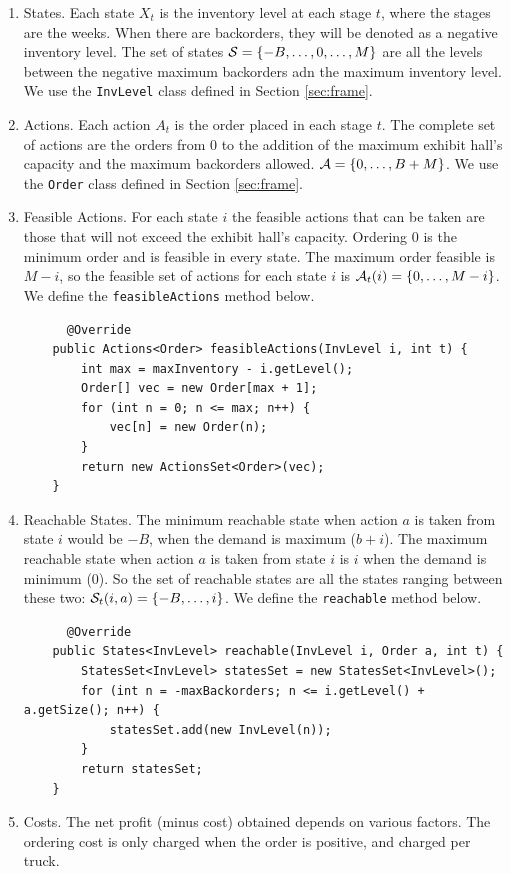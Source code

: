 \documentclass[11pt]{article}
\newcommand {\cA}{\ensuremath \mathcal{A}}
\newcommand {\cS}{\ensuremath \mathcal{S}}
\begin{document}
\begin{enumerate}
  \item States. Each state $X_t$ is the inventory level at each stage $t$, where the stages are the weeks. When there are backorders, they will be denoted as a negative inventory level. The set of states $\cS = \{-B, \ldots, 0, \ldots, M  \}$ are all the levels between the negative maximum backorders adn the maximum inventory level. We use the \lstinline!InvLevel! class defined in Section \ref{sec:frame}.
  \item Actions. Each action $A_t$ is the order placed in each stage $t$. The complete set of actions are the orders from 0 to the addition of the maximum exhibit hall's capacity and the maximum backorders allowed. $\cA = \{0,\ldots,B+M\}$. We use the \lstinline!Order! class defined in Section \ref{sec:frame}.
  \item Feasible Actions. For each state $i$ the feasible actions that can be taken are those that will not exceed the exhibit hall's capacity. Ordering 0 is the minimum order and is feasible in every state. The maximum order feasible is $M-i$, so the feasible set of actions for each state $i$ is $\cA_t(i) =\{0,\ldots,M-i\}$. We define the \lstinline!feasibleActions! method below.
  \begin{lstlisting}
      @Override
    public Actions<Order> feasibleActions(InvLevel i, int t) {
        int max = maxInventory - i.getLevel();
        Order[] vec = new Order[max + 1];
        for (int n = 0; n <= max; n++) {
            vec[n] = new Order(n);
        }
        return new ActionsSet<Order>(vec);
    }
  \end{lstlisting}
  \item Reachable States. The minimum reachable state when action $a$ is taken from state $i$ would be $-B$, when the demand is maximum ($b+i$). The maximum reachable state when action $a$ is taken from state $i$ is $i$ when the demand is minimum (0). So the set of reachable states are all the states ranging between these two: $\cS_t(i,a) = \{-B, \ldots, i\}$. We define the \lstinline!reachable! method below.
  \begin{lstlisting}
      @Override
    public States<InvLevel> reachable(InvLevel i, Order a, int t) {
        StatesSet<InvLevel> statesSet = new StatesSet<InvLevel>();
        for (int n = -maxBackorders; n <= i.getLevel() + a.getSize(); n++) {
            statesSet.add(new InvLevel(n));
        }
        return statesSet;
    }
\end{lstlisting}
    \item Costs. The net profit (minus cost) obtained depends on various factors. The ordering cost is only charged when the order is positive, and charged per truck.

\end{enumerate}
\end{document}
